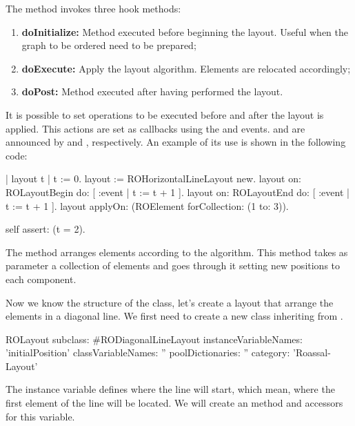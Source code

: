 \documentclass[a4paper,10pt,twoside]{book}
\begin{document}
The  method invokes three hook methods:

\begin{enumerate}
\item \textbf{doInitialize:} Method executed before beginning the layout. Useful when the graph to be ordered need to be prepared;
\item \textbf{doExecute:} Apply the layout algorithm. Elements are relocated accordingly;
\item \textbf{doPost:} Method executed after having performed the layout. 
\end{enumerate}

It is possible to set operations to be executed before and after the layout is applied. This actions are set as callbacks using the  and  events.
 and  are announced by  and , respectively.
An example of its use is shown in the following code:

\begin{code}{}
| layout t |
t := 0.
layout := ROHorizontalLineLayout new.
layout on: ROLayoutBegin do: [ :event | t := t + 1 ].
layout on: ROLayoutEnd do: [ :event | t := t + 1 ].
layout applyOn: (ROElement forCollection: (1 to: 3)).

self assert: (t = 2).
\end{code}

The  method arranges elements according to the algorithm. This method takes as parameter a collection of elements and goes through it setting new positions to each component.

Now we know the structure of the  class, let's create a layout that arrange the elements in a diagonal line.
We first need to create a new class inheriting from . 

\begin{code}{}
ROLayout subclass: #RODiagonalLineLayout
	instanceVariableNames: 'initialPosition'
	classVariableNames: ''
	poolDictionaries: ''
	category: 'Roassal-Layout'
\end{code}

The instance variable  defines where the line will start, which mean, where the first element of the line will be located. We will create an  method and accessors for this variable.
\end{document}
